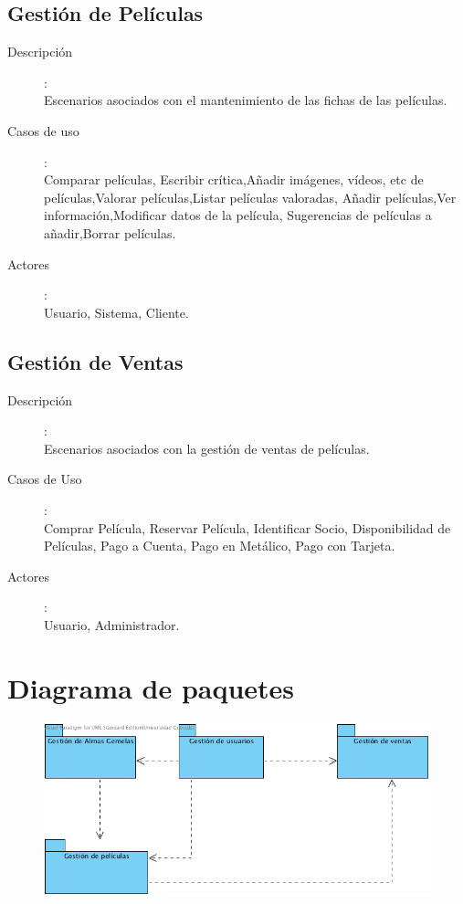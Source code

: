 \documentclass{article}
\begin{document}
\subsection*{Gestión de Películas}
	\begin{description}
	\item[Descripción]:\\ Escenarios asociados con el mantenimiento de las fichas de las películas.

	\item[Casos de uso]:\\ Comparar películas, Escribir crítica,Añadir imágenes, vídeos, etc de películas,Valorar películas,Listar películas valoradas, Añadir películas,Ver información,Modificar datos de la película, Sugerencias de películas a añadir,Borrar películas.

	\item[Actores]:\\ Usuario, Sistema, Cliente.
	\end{description}
\subsection*{Gestión de Ventas}
	\begin{description}
	\item[Descripción]:\\ Escenarios asociados con la gestión de ventas de películas.
	\item[Casos de Uso]:\\ Comprar Película, Reservar Película, Identificar Socio, Disponibilidad de Películas, Pago a Cuenta, Pago en Metálico, Pago con Tarjeta.
	\item[Actores]:\\ Usuario, Administrador.
	\end{description}
\section{Diagrama de paquetes}
	\begin{figure}[h]
		\begin{center}
   			\includegraphics[scale=0.75]{Paquetes.png}
 	  	\end{center}
 	 \end{figure}
\end{document}
